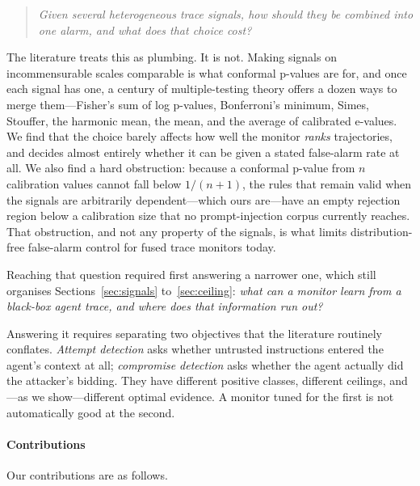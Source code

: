 \documentclass[preprint,12pt,authoryear]{elsarticle}
\theoremstyle{definition}
\begin{document}
\begin{quote}
\emph{Given several heterogeneous trace signals, how should they be combined into
one alarm, and what does that choice cost?}
\end{quote}

The literature treats this as plumbing. It is not. Making signals on
incommensurable scales comparable is what conformal p-values are for, and once
each signal has one, a century of multiple-testing theory offers a dozen ways to
merge them---Fisher's sum of log p-values, Bonferroni's minimum, Simes, Stouffer,
the harmonic mean, the mean, and the average of calibrated e-values. We find that
the choice barely affects how well the monitor \emph{ranks} trajectories, and
decides almost entirely whether it can be given a stated false-alarm rate at all.
We also find a hard obstruction: because a conformal p-value from $n$ calibration
values cannot fall below $1/(n{+}1)$, the rules that remain valid when the signals
are arbitrarily dependent---which ours are---have an empty rejection region below a
calibration size that no prompt-injection corpus currently reaches. That
obstruction, and not any property of the signals, is what limits distribution-free
false-alarm control for fused trace monitors today.

Reaching that question required first answering a narrower one, which still
organises Sections~\ref{sec:signals} to~\ref{sec:ceiling}:
\emph{what can a monitor learn from a black-box agent trace, and where does that
information run out?}

Answering it requires separating two objectives that the literature routinely
conflates. \emph{Attempt detection} asks whether untrusted instructions entered
the agent's context at all; \emph{compromise detection} asks whether the agent
actually did the attacker's bidding. They have different positive classes,
different ceilings, and---as we show---different optimal evidence. A monitor
tuned for the first is not automatically good at the second.

\paragraph{Contributions} Our contributions are as follows.
\end{document}
